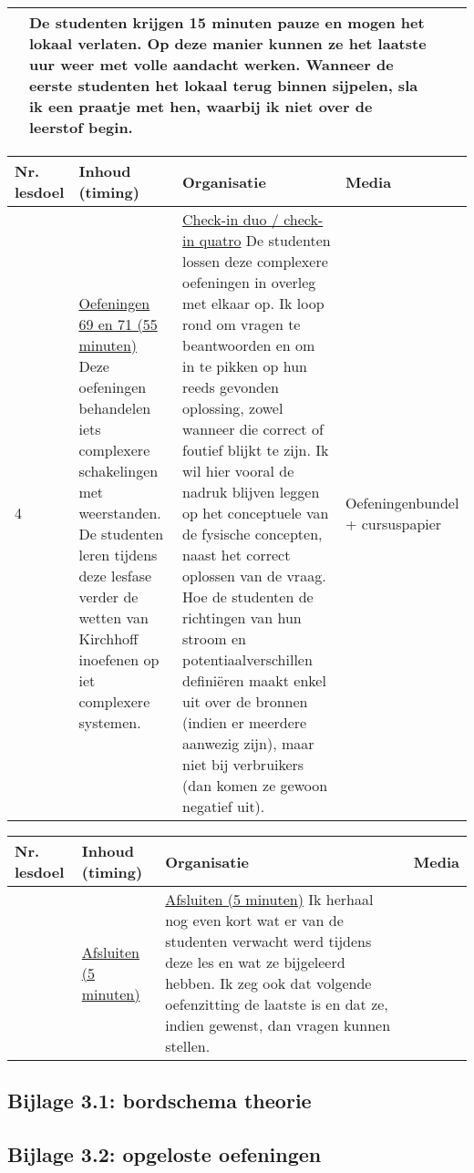\begin{landscape}
\begin{tabularx}{1.56\textwidth}{|p{1.5cm}|p{6cm}|X|p{4cm}|}
	
	&    De studenten krijgen 15 minuten pauze en mogen het lokaal verlaten. Op deze manier kunnen ze het laatste uur weer met volle aandacht werken. 
	Wanneer de eerste studenten het lokaal terug binnen sijpelen, sla ik een praatje met hen, waarbij ik niet over de leerstof begin. 
	& 
	\\ \hline
\end{tabularx}


\begin{tabularx}{1.56\textwidth}{|p{1.5cm}|p{6cm}|X|p{4cm}|}
	\hline
	\textbf{Nr. lesdoel } & \textbf{Inhoud (timing)}  & \textbf{Organisatie } & \textbf{Media } \\ \hline
	4\newline 6&\underline{Oefeningen  69 en 71 (55 minuten)}\newline
	Deze oefeningen behandelen iets complexere schakelingen met weerstanden. De studenten leren tijdens deze lesfase verder de wetten van Kirchhoff inoefenen op iet complexere systemen.
 &  \underline{Check-in duo / check-in quatro}\newline
 De studenten lossen deze complexere oefeningen in overleg met elkaar op. Ik loop rond om vragen te beantwoorden en om in te pikken op hun reeds gevonden oplossing, zowel wanneer die correct of foutief blijkt te zijn. Ik wil hier vooral de nadruk blijven leggen op het conceptuele van de fysische concepten, naast het correct oplossen van de vraag. Hoe de studenten de richtingen van hun stroom en potentiaalverschillen definiëren maakt enkel uit over de bronnen (indien er meerdere aanwezig zijn), maar niet bij verbruikers (dan komen ze gewoon negatief uit). 
	& Oefeningenbundel + cursuspapier
	\\ \hline
\end{tabularx}



\begin{tabularx}{1.56\textwidth}{|p{1.5cm}|p{6cm}|X|p{4cm}|}
	\hline
	\textbf{Nr. lesdoel } & \textbf{Inhoud (timing)}  & \textbf{Organisatie } & \textbf{Media } \\ \hline
	&\underline{Afsluiten (5 minuten)}\newline 
	&  \underline{Afsluiten (5 minuten)}\newline
	Ik herhaal nog even kort wat er van de studenten verwacht werd tijdens deze les en wat ze bijgeleerd hebben. Ik zeg ook dat volgende oefenzitting de laatste is en dat ze, indien gewenst, dan vragen kunnen stellen.
	& 
	\\ \hline
\end{tabularx}


	
	
	
	
	
	
\end{landscape}



\subsection*{Bijlage 3.1: bordschema theorie}
\subsection*{Bijlage 3.2: opgeloste oefeningen}




